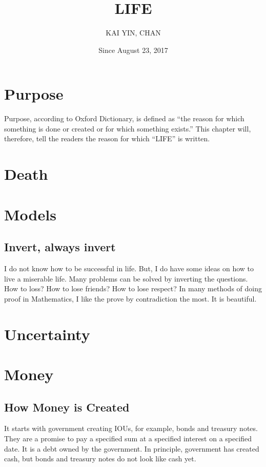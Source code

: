 \documentclass[a4paper]{report}
\begin{document}
\title{LIFE}
\author{KAI YIN, CHAN}
\date{Since August 23, 2017}
\maketitle

\chapter{Purpose}
Purpose, according to Oxford Dictionary, is defined as ``the reason for which something is done or created or for which something exists.'' This chapter will, therefore, tell the readers the reason for which ``LIFE'' is written.

\chapter{Death}

\chapter{Models}
\section{Invert, always invert}
I do not know how to be successful in life. But, I do have some ideas on how to live a miserable life. Many problems can be solved by inverting the questions. How to loss? How to lose friends? How to lose respect? In many methods of doing proof in Mathematics, I like the prove by contradiction the most. It is beautiful.

\chapter{Uncertainty}

\chapter{Money}
\section{How Money is Created}
It starts with government creating IOUs, for example, bonds and treasury notes. They are a promise to pay a specified sum at a specified interest on a specified date. It is a debt owned by the government. In principle, government has created cash, but bonds and treasury notes do not look like cash yet.
\end{document}

